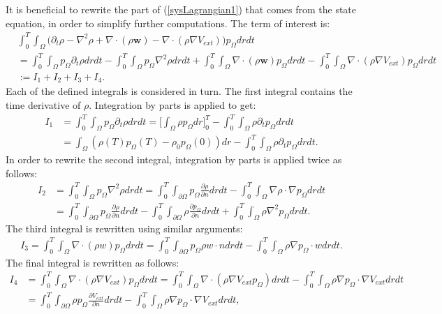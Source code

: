 It is beneficial to rewrite the part of (\ref{sysLagrangian1}) that comes from the state equation, in order to simplify further computations.
The term of interest is:
\begin{align*}
 &\int_0^T \int_\Omega \bigg( \partial_t \rho - \nabla^2 \rho + \nabla \cdot (\rho \mathbf{w}) - \nabla \cdot (\rho \nabla V_{ext}) \bigg) p_\Omega dr dt \\
 &=   \int_0^T \int_\Omega   p_\Omega \partial_t \rho dr dt -\int_0^T  \int_\Omega  p_\Omega \nabla^2 \rho dr dt  + \int_0^T \int_\Omega \nabla \cdot (\rho \mathbf{w}) p_\Omega dr dt -\int_0^T \int_\Omega \nabla \cdot (\rho \nabla V_{ext})p_\Omega dr dt \\
 &:= I_1 + I_2 + I_3 + I_4. 
\end{align*}
Each of the defined integrals is considered in turn.
The first integral contains the time derivative of $\rho$. Integration by parts is applied to get:
\begin{align*}
I_1&=\int_0^T \int_\Omega  p_\Omega \partial_t \rho dr dt  = \bigg[ \int_\Omega \rho p_\Omega dr \bigg]_0^T - \int_0^T \int_\Omega \rho\partial_t  p_\Omega dr dt\\
&= \int_\Omega (\rho(T) p_\Omega(T) -\rho_0 p_\Omega(0))dr  - \int_0^T \int_\Omega \rho\partial_t  p_\Omega dr dt .
\end{align*}
In order to rewrite the second integral, integration by parts is applied twice as follows:
\begin{align*}
I_2&=  \int_0^T \int_\Omega p_\Omega \nabla^2 \rho dr dt  
=\int_0^T \int_{\partial \Omega}  p_\Omega \frac{\partial \rho}{\partial {n}} dr dt  -\int_0^T \int_\Omega  \nabla \rho \cdot \nabla p_\Omega dr dt \\
&=\int_0^T \int_{\partial \Omega}  p_\Omega \frac{\partial \rho}{\partial n} dr dt - \int_0^T \int_{\partial \Omega}  \rho \frac{\partial p_\Omega }{\partial {n}} dr dt   +\int_0^T \int_\Omega \rho \nabla^2 p_\Omega dr dt .
\end{align*} 
The third integral is rewritten using similar arguments:
\begin{align*}
I_3 = \int_0^T \int_\Omega \nabla \cdot (\rho w) p_\Omega dr dt = \int_0^T  \int_{\partial \Omega}  p_\Omega \rho w \cdot n dr dt  - \int_0^T \int_\Omega \rho \nabla p_\Omega \cdot w dr dt.
\end{align*}
The final integral is rewritten as follows:
\begin{align*}
I_4 &=\int_0^T \int_\Omega \nabla \cdot (\rho \nabla V_{ext})p_\Omega dr dt=\int_0^T \int_\Omega \nabla \cdot (\rho \nabla V_{ext}p_\Omega) dr dt  - \int_0^T \int_\Omega  \rho \nabla p_\Omega\cdot \nabla V_{ext} dr dt\\
&= \int_0^T \int_{\partial\Omega}  \rho p_\Omega \frac{\partial V_{ext}}{\partial n} dr dt - \int_0^T \int_\Omega  \rho \nabla p_\Omega\cdot \nabla V_{ext} dr dt,
\end{align*}

